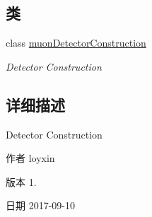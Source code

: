 \subsection*{类}
\begin{DoxyCompactItemize}
\item 
class \hyperlink{classmuonDetectorConstruction}{muon\+Detector\+Construction}
\begin{DoxyCompactList}\small\item\em Detector Construction \end{DoxyCompactList}\end{DoxyCompactItemize}


\subsection{详细描述}
Detector Construction 

\begin{DoxyAuthor}{作者}
loyxin 
\end{DoxyAuthor}
\begin{DoxyVersion}{版本}
1. 
\end{DoxyVersion}
\begin{DoxyDate}{日期}
2017-\/09-\/10 
\end{DoxyDate}
